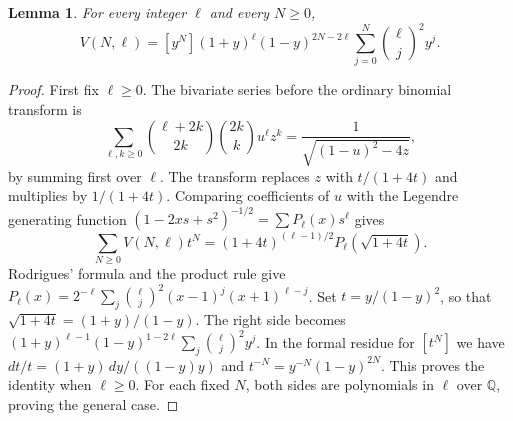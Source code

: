 \documentclass[11pt]{article}
\newtheorem{lemma}[theorem]{Lemma}
\begin{document}
\begin{lemma}\label{change}
For every integer $\ell$ and every $N\ge0$,
\[
 V(N,\ell)=[y^N](1+y)^\ell(1-y)^{2N-2\ell}
                  \sum_{j=0}^N\binom\ell j^2y^j .
\]
\end{lemma}
\begin{proof}
First fix $\ell\ge0$. The bivariate series before the ordinary binomial transform is
\[
 \sum_{\ell,k\ge0}\binom{\ell+2k}{2k}\binom{2k}{k} u^\ell z^k
 =\frac1{\sqrt{(1-u)^2-4z}},
\]
by summing first over $\ell$. The transform replaces $z$ with $t/(1+4t)$ and multiplies by $1/(1+4t)$. Comparing coefficients of $u$ with the Legendre generating function $(1-2xs+s^2)^{-1/2}=\sum P_\ell(x)s^\ell$ gives
\[
 \sum_{N\ge0}V(N,\ell)t^N=(1+4t)^{(\ell-1)/2}P_\ell(\sqrt{1+4t}).
\]
Rodrigues' formula and the product rule give
$P_\ell(x)=2^{-\ell}\sum_j\binom\ell j^2(x-1)^j(x+1)^{\ell-j}$.
Set $t=y/(1-y)^2$, so that $\sqrt{1+4t}=(1+y)/(1-y)$. The right side becomes
$(1+y)^{\ell-1}(1-y)^{1-2\ell}\sum_j\binom\ell j^2y^j$.
In the formal residue for $[t^N]$ we have $dt/t=(1+y)\,dy/((1-y)y)$ and $t^{-N}=y^{-N}(1-y)^{2N}$. This proves the identity when $\ell\ge0$. For each fixed $N$, both sides are polynomials in $\ell$ over $\mathbb Q$, proving the general case.
\end{proof}
\end{document}

